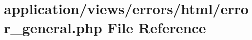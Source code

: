 \hypertarget{html_2error__general_8php}{}\section{application/views/errors/html/error\+\_\+general.php File Reference}
\label{html_2error__general_8php}
